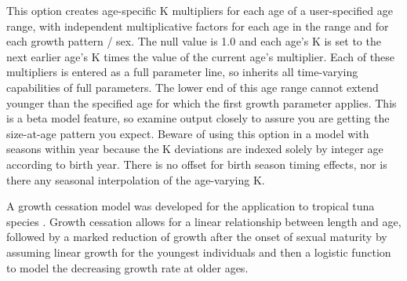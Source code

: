 This option creates age-specific K multipliers for each age of a user-specified age range, with independent multiplicative factors for each age in the range and for each growth pattern / sex. The null value is 1.0 and each age's K is set to the next earlier age's K times the value of the current age's multiplier. Each of these multipliers is entered as a full parameter line, so inherits all time-varying capabilities of full parameters. The lower end of this age range cannot extend younger than the specified age for which the first growth parameter applies. This is a beta model feature, so examine output closely to assure you are getting the size-at-age pattern you expect.  Beware of using this option in a model with seasons within year because the K deviations are indexed solely by integer age according to birth year.  There is no offset for birth season timing effects, nor is there any seasonal interpolation of the age-varying K.

\hypertarget{GrowthCessation}{}
A growth cessation model was developed for the application to tropical tuna species \citep{maunder_growth_2018}. Growth cessation allows for a linear relationship between length and age, followed by a marked reduction of growth after the onset of sexual maturity by assuming linear growth for the youngest individuals and then a logistic function to model the decreasing growth rate at older ages.

